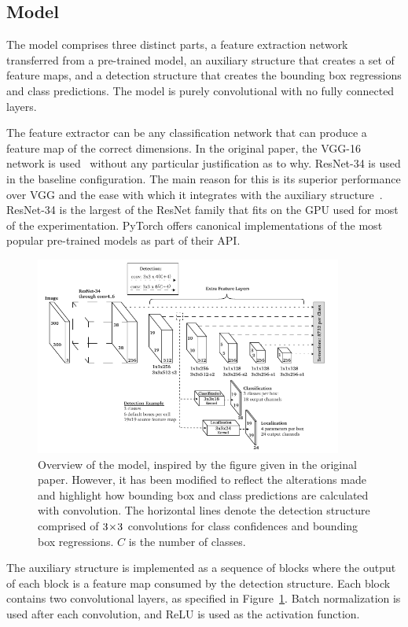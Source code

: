 \subsection{Model}
The model comprises three distinct parts, a feature extraction network transferred from a pre-trained model, an auxiliary structure that creates a set of feature maps, and a detection structure that creates the bounding box regressions and class predictions.
The model is purely convolutional with no fully connected layers.

The feature extractor can be any classification network that can produce a feature map of the correct dimensions.
In the original paper, the VGG-16 network is used\ \parencite{simonyan2015deep} without any particular justification as to why.
ResNet-34 is used in the baseline configuration.
The main reason for this is its superior performance over VGG and the ease with which it integrates with the auxiliary structure\ \parencite{he2015deep}.
ResNet-34 is the largest of the ResNet family that fits on the GPU used for most of the experimentation.
PyTorch offers canonical implementations of the most popular pre-trained models as part of their API\@.

\begin{figure}[htb]
  \centering
  \includegraphics[width=0.9\textwidth]{figs/method/model.pdf}
  \caption[Model architecture overview]{Overview of the model, inspired by the figure given in the original paper. However, it has been modified to reflect the alterations made and highlight how bounding box and class predictions are calculated with convolution.
The horizontal lines denote the detection structure comprised of \(3\!\times \! 3\) convolutions for class confidences and bounding box regressions. \(C\) is the number of classes.}\label{fig:model}
\end{figure}
The auxiliary structure is implemented as a sequence of blocks where the output of each block is a feature map consumed by the detection structure.
Each block contains two convolutional layers, as specified in Figure~\ref{fig:model}.
Batch normalization is used after each convolution, and ReLU is used as the activation function.

